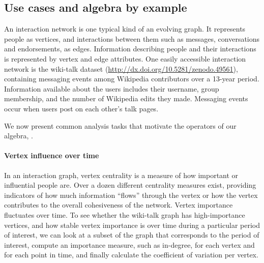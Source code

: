 \subsection{Use cases and algebra by example}
\label{sec:cases}

An interaction network is one typical kind of an evolving graph.  It
represents people as vertices, and interactions between them such as
messages, conversations and endorsements, as edges.  Information
describing people and their interactions is represented by vertex and
edge attributes.  One easily accessible interaction network is the
wiki-talk dataset (\url{http://dx.doi.org/10.5281/zenodo.49561}),
containing messaging events among Wikipedia contributors over a
13-year period.  Information available about the users includes their
username, group membership, and the number of Wikipedia edits they
made.  Messaging events occur when users post on each other's talk
pages.

We now present common analysis tasks that motivate the operators of
our algebra, \tga. 

\paragraph*{Vertex influence over time}
In an interaction graph, vertex centrality is a measure of how
important or influential people are.  Over a dozen different
centrality measures exist, providing indicators of how much
information ``flows'' through the vertex or how the vertex contributes
to the overall cohesiveness of the network.  Vertex importance
fluctuates over time.  To see whether the wiki-talk graph has
high-importance vertices, and how stable vertex importance is over
time during a particular period of interest, we can look at a subset
of the graph that corresponds to the period of interest, compute an
importance measure, such as in-degree, for each vertex and for each
point in time, and finally calculate the coefficient of variation per
vertex.


